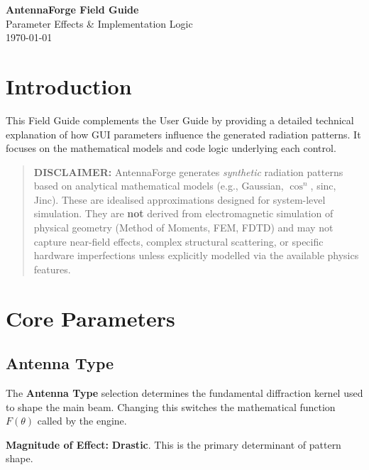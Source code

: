 \documentclass[11pt,a4paper]{article}
\begin{document}
\begin{center}
    {\Huge\bfseries\color{afdark} AntennaForge Field Guide}\\[0.5em]
    {\Large Parameter Effects \& Implementation Logic}\\[1em]
    {\large\today}
\end{center}

\vspace{1cm}

\tableofcontents
\newpage

\section{Introduction}

This Field Guide complements the User Guide by providing a detailed technical explanation of how GUI parameters influence the generated radiation patterns. It focuses on the mathematical models and code logic underlying each control.

\begin{quote}
    \textbf{\color{afred} DISCLAIMER:} AntennaForge generates \emph{synthetic} radiation patterns based on analytical mathematical models (e.g., Gaussian, $\cos^n$, sinc, Jinc). These are idealised approximations designed for system-level simulation. They are \textbf{not} derived from electromagnetic simulation of physical geometry (Method of Moments, FEM, FDTD) and may not capture near-field effects, complex structural scattering, or specific hardware imperfections unless explicitly modelled via the available physics features.
\end{quote}

\newpage
\section{Core Parameters}

\subsection{Antenna Type}
The \textbf{Antenna Type} selection determines the fundamental diffraction kernel used to shape the main beam. Changing this switches the mathematical function $F(\theta)$ called by the engine.

\textbf{Magnitude of Effect:} \textbf{Drastic}. This is the primary determinant of pattern shape.
\end{document}
